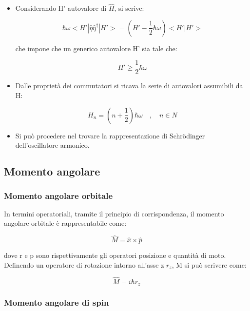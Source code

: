 \documentclass{article}
\begin{document}
\begin{itemize}
    \item Considerando H' autovalore di $\hat{H}$, si scrive:
    
    \begin{equation}
        \hbar \omega<H' |\hat{\eta}\hat{\eta}^{\dagger}|H'>=(H'-\frac{1}{2}\hbar \omega)<H' |H'>
    \end{equation}

    che impone che un generico autovalore H' sia tale che:

    \begin{equation}
        H'\geq \frac{1}{2}\hbar \omega
    \end{equation}

    \item Dalle proprietà dei commutatori si ricava la serie di autovalori assumibili da H:
    
    \begin{equation}
        H_n=(n+\frac{1}{2})\hbar \omega \quad , \quad n \in N
    \end{equation}

    \item Si può procedere nel trovare la rappresentazione di Schrödinger dell'oscillatore armonico.
\end{itemize}

\subsection{Momento angolare}
\subsubsection{Momento angolare orbitale}
In termini operatoriali, tramite il principio di corrispondenza, il momento angolare orbitale è rappresentabile come:

\begin{equation}
    \hat{M}=\hat{x}\times \hat{p}
\end{equation}

dove r e p sono rispettivamente gli operatori posizione e quantità di moto.
Definendo un operatore di rotazione intorno all'asse z $r_z$, M si può scrivere come:

\begin{equation}
    \hat{M}= i\hbar r_z
\end{equation}

\subsubsection{Momento angolare di spin}
\end{document}
